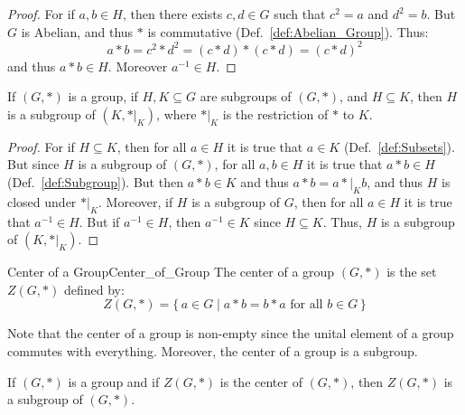         \begin{proof}
            For if $a,b\in{H}$, then there exists $c,d\in{G}$ such that
            $c^{2}=a$ and $d^{2}=b$. But $G$ is Abelian, and thus $*$ is
            commutative (Def.~\ref{def:Abelian_Group}). Thus:
            \begin{equation}
                a*b=c^{2}*d^{2}=(c*d)*(c*d)=(c*d)^{2}
            \end{equation}
            and thus $a*b\in{H}$. Moreover $a^{\minus{1}}\in{H}$.
        \end{proof}
        \begin{theorem}
            If $(G,*)$ is a group, if $H,K\subseteq{G}$ are subgroups of
            $(G,*)$, and $H\subseteq{K}$, then $H$ is a subgroup of
            $(K,*|_{K})$, where $*|_{K}$ is the restriction of $*$ to $K$.
        \end{theorem}
        \begin{proof}
            For if $H\subseteq{K}$, then for all $a\in{H}$ it is true that
            $a\in{K}$ (Def.~\ref{def:Subsets}). But since $H$ is a subgroup of
            $(G,*)$, for all $a,b\in{H}$ it is true that $a*b\in{H}$
            (Def.~\ref{def:Subgroup}). But then $a*b\in{K}$ and thus
            $a*b=a*|_{K}b$, and thus $H$ is closed under $*|_{K}$. Moreover, if
            $H$ is a subgroup of $G$, then for all $a\in{H}$ it is true that
            $a^{\minus{1}}\in{H}$. But if $a^{\minus{1}}\in{H}$, then
            $a^{\minus{1}}\in{K}$ since $H\subseteq{K}$. Thus, $H$ is a subgroup
            of $(K,*|_{K})$.
        \end{proof}
        \begin{fdefinition}{Center of a Group}{Center_of_Group}
            The center of a group $(G,*)$ is the set $Z(G,*)$ defined by:
            \begin{equation*}
                Z(G,*)=\{\,a\in{G}\;|\;a*b=b*a\textrm{ for all }b\in{G}\,\}
            \end{equation*}
        \end{fdefinition}
        Note that the center of a group is non-empty since the unital element
        of a group commutes with everything. Moreover, the center of a group is
        a subgroup.
        \begin{theorem}
            If $(G,*)$ is a group and if $Z(G,*)$ is the center of $(G,*)$, then
            $Z(G,*)$ is a subgroup of $(G,*)$.
        \end{theorem}
